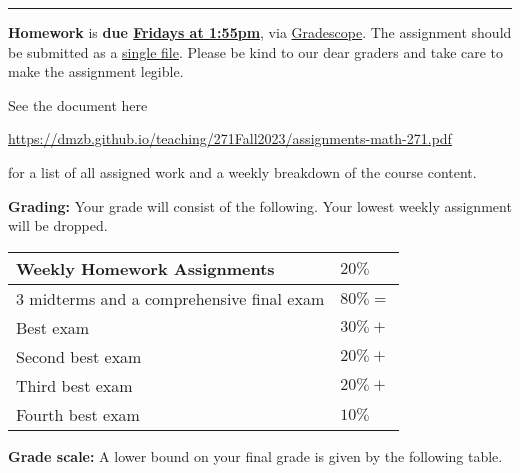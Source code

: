 \documentclass[12pt]{article}
\begin{document}
 
\medskip
 \hrule
\medskip

\noindent \textbf{Homework} is \textbf{due \underline{Fridays at 1:55pm}}, via \underline{Gradescope}. The assignment should be submitted as a \underline{single file}. Please be kind to our dear graders and take care to make the assignment legible.
\smallskip

\noindent See the document here
\begin{center}
  \url{https://dmzb.github.io/teaching/271Fall2023/assignments-math-271.pdf}
\end{center}
for a list of all assigned work and a weekly breakdown of the course content.
\medskip






\noindent\textbf{Grading:} 
Your grade will consist of the following. Your lowest weekly assignment will be dropped.

\begin{center}
  \begin{tabular}{|l|l|}
    \hline
    Weekly Homework Assignments & $20\%$ \\
    \hline    
    3 midterms and a comprehensive final exam  & $80\% = $   	 \\
    Best exam  & $30\% + $ 	 \\
    Second best exam& $20\% + $ 	 \\
    Third best exam & $20\% + $ 	 \\
    Fourth best exam & $10\%$ 	 \\ 
    \hline
  \end{tabular}
\end{center}

\vspace*{.15in}
\noindent\textbf{Grade scale:} 
A lower bound on your final grade is given by the following table. 
\end{document}
